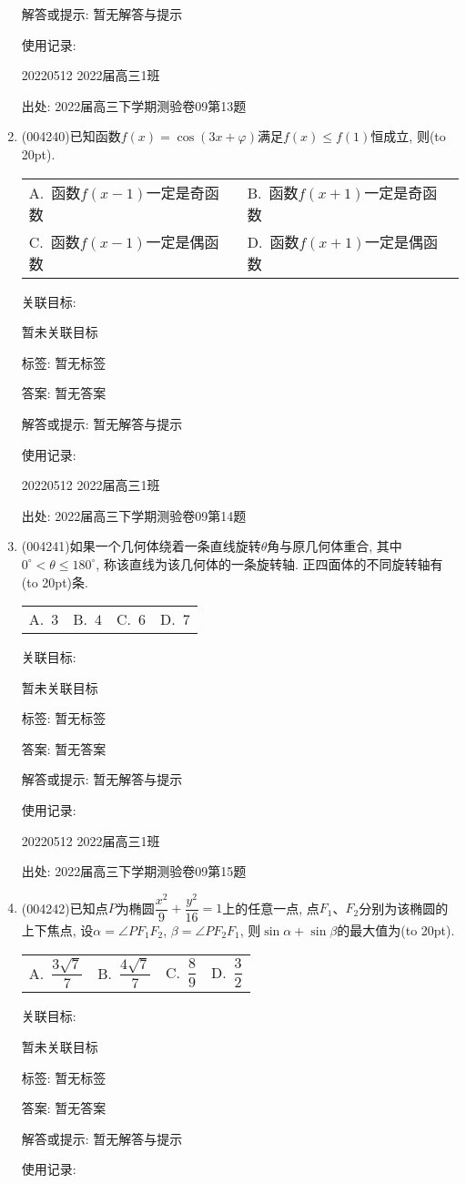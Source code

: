 \documentclass[10pt,a4paper]{article}
\newcommand{\bracket}[1]{(\hbox to #1pt{})}
\newcommand{\twoch}[4]{\par\begin{tabular}{p{.46\textwidth}p{.46\textwidth}}
A.~#1& B.~#2\\
C.~#3& D.~#4
\end{tabular}}
\newcommand{\fourch}[4]{\par\begin{tabular}{p{.23\textwidth}p{.23\textwidth}p{.23\textwidth}p{.23\textwidth}}
A.~#1 &B.~#2& C.~#3& D.~#4
\end{tabular}}
\begin{document}
\begin{enumerate}[1.]
解答或提示: 暂无解答与提示

使用记录:

20220512	2022届高三1班	


出处: 2022届高三下学期测验卷09第13题
\item { (004240)}已知函数$f(x)=\cos (3x+\varphi)$满足$f(x)\le f(1)$恒成立, 则\bracket{20}.
\twoch{函数$f(x-1)$一定是奇函数}{函数$f(x+1)$一定是奇函数}{函数$f(x-1)$一定是偶函数}{函数$f(x+1)$一定是偶函数}


关联目标:

暂未关联目标



标签: 暂无标签

答案: 暂无答案

解答或提示: 暂无解答与提示

使用记录:

20220512	2022届高三1班	


出处: 2022届高三下学期测验卷09第14题
\item { (004241)}如果一个几何体绕着一条直线旋转$\theta$角与原几何体重合, 其中$0^\circ<\theta \le 180^\circ$, 称该直线为该几何体的一条旋转轴. 正四面体的不同旋转轴有\bracket{20}条.
\fourch{$3$}{$4$}{$6$}{$7$}


关联目标:

暂未关联目标



标签: 暂无标签

答案: 暂无答案

解答或提示: 暂无解答与提示

使用记录:

20220512	2022届高三1班	


出处: 2022届高三下学期测验卷09第15题
\item { (004242)}已知点$P$为椭圆$\dfrac{x^2}9+\dfrac{y^2}{16}=1$上的任意一点, 点$F_1$、$F_2$分别为该椭圆的上下焦点, 设$\alpha =\angle PF_1F_2$, $\beta =\angle PF_2F_1$, 则$\sin \alpha +\sin \beta$的最大值为\bracket{20}.
\fourch{$\dfrac{3\sqrt 7}7$}{$\dfrac{4\sqrt 7}7$}{$\dfrac 89$}{$\dfrac 32$}


关联目标:

暂未关联目标



标签: 暂无标签

答案: 暂无答案

解答或提示: 暂无解答与提示

使用记录:


\end{enumerate}
\end{document}
